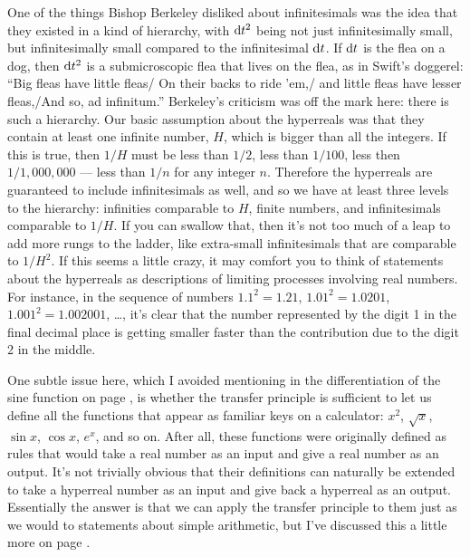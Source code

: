 One of the things Bishop Berkeley disliked about infinitesimals was the idea that
they existed in a kind of hierarchy, with $\textup{d} t^2$ being not just infinitesimally small, but infinitesimally
small compared to the infinitesimal $\textup{d} t$.
If $\textup{d} t$ is the flea on a dog, then $\textup{d} t^2$ is a submicroscopic
flea that lives on the flea, as in Swift's doggerel: ``Big fleas have little fleas/ On their backs to ride 'em,/
and little fleas have lesser fleas,/And so, ad infinitum.'' Berkeley's criticism was off the mark here: there is
such a hierarchy. Our basic assumption about the hyperreals was that they contain at least one infinite number,
$H$, which is bigger than all the integers. If this is true, then $1/H$ must be less than $1/2$, less than
$1/100$, less then $1/1,000,000$ --- less than $1/n$ for any integer $n$. Therefore the hyperreals are guaranteed
to include infinitesimals as well, and so we have at least three levels to the hierarchy: infinities comparable
to $H$, finite numbers, and infinitesimals comparable to $1/H$. If you can swallow that, then it's not too much
of a leap to add more rungs to the ladder, like extra-small infinitesimals that are comparable to $1/H^2$.
If this seems a little crazy, it may comfort you to think of statements about the hyperreals as descriptions
of limiting processes involving real numbers. For instance, in the sequence of numbers $1.1^2=1.21$,
$1.01^2=1.0201$, $1.001^2=1.002001$, \ldots, it's clear that the number represented by the digit 1 in the final decimal place is getting
smaller faster than the contribution due to the digit 2 in the middle.

\label{transcendentals}
One subtle issue here, which I avoided mentioning in the differentiation of the sine function on page \pageref{eg:derivative-of-sin},
is whether the transfer principle is sufficient to let us define all the functions that
appear as familiar keys on a calculator: $x^2$, $\sqrt{x}$, $\sin x$, $\cos x$, $e^x$, and so on.
After all, these functions were originally defined as rules that would take a real number as an input
and give a real number as an output. It's not trivially obvious that their definitions can naturally be extended
to take a hyperreal number as an input and give back a hyperreal as an output. Essentially the answer is that
we can apply the transfer principle to them just as we would to statements about simple arithmetic, but I've discussed
this a little more on page \pageref{detour:transcendentals}.

\pagebreak

